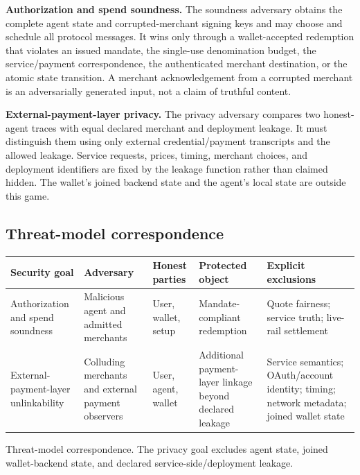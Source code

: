 \documentclass[letterpaper]{article}
\begin{document}
\textbf{Authorization and spend soundness.} The soundness adversary obtains the
complete agent state and corrupted-merchant signing keys and may choose and
schedule all protocol messages. It wins only through a wallet-accepted
redemption that violates an issued mandate, the single-use denomination budget,
the service/payment correspondence, the authenticated merchant destination, or
the atomic state transition. A merchant acknowledgement from a corrupted merchant is an
adversarially generated input, not a claim of truthful content.

\textbf{External-payment-layer privacy.} The privacy adversary compares two
honest-agent traces with equal declared merchant and deployment leakage. It
must distinguish them using only external credential/payment transcripts and
the allowed leakage. Service requests, prices, timing, merchant choices, and
deployment identifiers are fixed by the leakage function rather than claimed
hidden. The wallet's joined backend state and the agent's local state are
outside this game.

\subsection{Threat-model correspondence}
\label{sec:trace-leakage}

\begin{MMAppendixTable}[tb]
\centering
\begin{tabularx}{\columnwidth}{@{}YYYYY@{}}
\toprule
\textbf{Security goal} & \textbf{Adversary} & \textbf{Honest parties} & \textbf{Protected object} & \textbf{Explicit exclusions} \\
\midrule
Authorization and spend soundness & Malicious agent and admitted merchants & User, wallet, setup & Mandate-compliant redemption & Quote fairness; service truth; live-rail settlement \\
External-payment-layer unlinkability & Colluding merchants and external payment observers & User, agent, wallet & Additional payment-layer linkage beyond declared leakage & Service semantics; OAuth/account identity; timing; network metadata; joined wallet state \\
\bottomrule
\end{tabularx}
\caption{Threat-model correspondence. The privacy goal excludes agent state,
joined wallet-backend state, and declared service-side/deployment leakage.}
\label{tab:threat-model-correspondence}
\end{MMAppendixTable}
\end{document}

